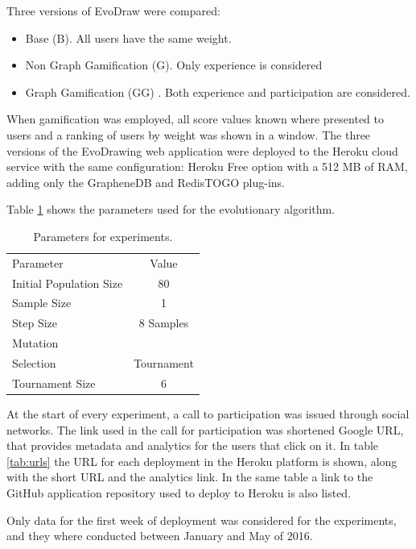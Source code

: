 Three versions of EvoDraw were compared:
\begin{itemize}
\item Base (B). All users have the same weight.
\item Non Graph Gamification (G). Only experience is considered
\item Graph Gamification (GG) . Both experience and participation are considered.
\end{itemize}
When gamification was employed, all score values known where presented to users
and a ranking of users by weight was shown in a window.
The three versions of the EvoDrawing web application were deployed to the
Heroku cloud service with the same configuration: Heroku Free option with a 512 MB of RAM, 
adding only the GrapheneDB and RedisTOGO plug-ins.

Table \ref{tab:params} shows the parameters used for the evolutionary algorithm. 

\begin{table}
  \small
  \caption{ Parameters for experiments.  }
  \label{tab:params} 
  \centering
  \small
  \begin{tabular}{l  c}
    \hline\noalign{\smallskip}
     Parameter & Value \\
    \noalign{\smallskip}\hline\noalign{\smallskip}
    Initial Population Size   & 80 \\ \hline
    Sample Size & 1 \\ \hline
    Step Size & 8 Samples \\ \hline
    Mutation &  \\ \hline
    Selection & Tournament \\ \hline
    Tournament Size &  6 \\ \hline
  \end{tabular}
\end{table}

At the start of every experiment, a call to participation was issued
through social networks.  The link used in the call for participation
was shortened Google URL, that provides metadata and analytics for the
users that click on it.  In table \ref{tab:urls} the URL for each 
deployment in the Heroku platform is shown,
along with the short URL and the analytics link. In the same table a link to the GitHub 
application repository used to deploy to Heroku is also listed.    

Only data for the first week of deployment was considered 
for the experiments, and they where conducted 
between January and May of 2016. 

